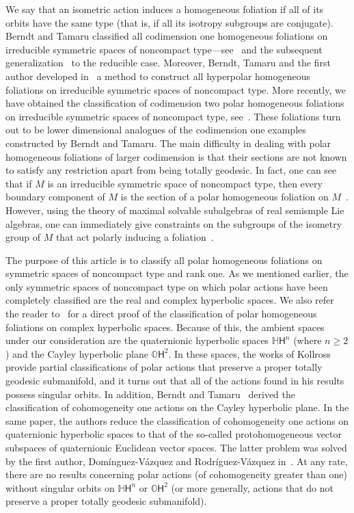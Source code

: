 \documentclass[12pt, a4paper]{amsart}
\newcommand{\s}{\mathsf}
\renewcommand{\H}{\mathbb{H}}
\renewcommand{\O}{\mathbb{O}}
\theoremstyle{definition}
\begin{document}
We say that an isometric action induces a homogeneous foliation if all of its
orbits have the same type
(that is, if all its isotropy subgroups are conjugate).
Berndt and Tamaru classified all codimension one homogeneous foliations
on irreducible symmetric spaces of noncompact type—see~\cite{BerndtTamaru03}
and the subsequent generalization~\cite{Solonenko21} to the reducible case.
Moreover, Berndt, Tamaru and the first author developed in~\cite{BerndtDiazTamaru10}
a method to construct all hyperpolar homogeneous foliations on irreducible symmetric
spaces of noncompact type.
More recently, we have obtained the classification of
codimension two polar homogeneous foliations on irreducible symmetric spaces of
noncompact type, see~\cite{DiazLorenzo}.
These foliations turn out to be lower dimensional analogues of the codimension one
examples constructed by Berndt and Tamaru.
The main difficulty in dealing with polar homogeneous foliations of larger codimension
is that their sections are not known to satisfy any restriction apart from being
totally geodesic.
In fact, one can see that if $M$ is an irreducible symmetric space of noncompact type,
then every boundary component of $M$ is the section of a polar homogeneous foliation
on $M$~\cite{BerndtDiazTamaru10}.
However, using the theory of maximal solvable subalgebras of real semismple Lie algebras,
one can immediately give constraints on the subgroups of the isometry group of $M$
that act polarly inducing a foliation~\cite[Proposition~4.2]{DiazLorenzo}.

The purpose of this article is to classify all polar homogeneous foliations on
symmetric spaces of noncompact type and rank one.
As we mentioned earlier, the only symmetric spaces of noncompact type on which
polar actions have been completely classified are the real and complex
hyperbolic spaces.
We also refer the reader to~\cite{berndt-diaz-ramos} for a direct proof of the
classification of polar homogeneous foliations on complex hyperbolic spaces.
Because of this, the ambient spaces under our consideration are the
quaternionic hyperbolic spaces $\H\s{H}^n$ (where $n\geq 2$)
and the Cayley hyperbolic plane $\O\s{H}^2$.
In these spaces, the works of Kollross~\cite{kollross-duality,kollross-octonions}
provide partial classifications of polar actions that preserve a proper totally
geodesic submanifold, and it turns out that all of the actions found in his results possess
singular orbits.
In addition, Berndt and Tamaru~\cite{BerndtTamaru07} derived the classification of
cohomogeneity one actions on the Cayley hyperbolic plane.
In the same paper, the authors reduce the classification of cohomogeneity one
actions on quaternionic hyperbolic spaces to that of the so-called protohomogeneous
vector subspaces of quaternionic Euclidean vector spaces.
The latter problem was solved by the first author, Dom\'{i}nguez-V\'{a}zquez and
Rodr\'{i}guez-V\'{a}zquez in~\cite{DiazDominguezRodriguez21}.
At any rate, there are no results concerning polar actions (of cohomogeneity greater than one)
without singular orbits on $\H\s{H}^n$ or $\O\s{H}^{2}$
(or more generally, actions that do not preserve a proper totally geodesic submanifold).
\end{document}
